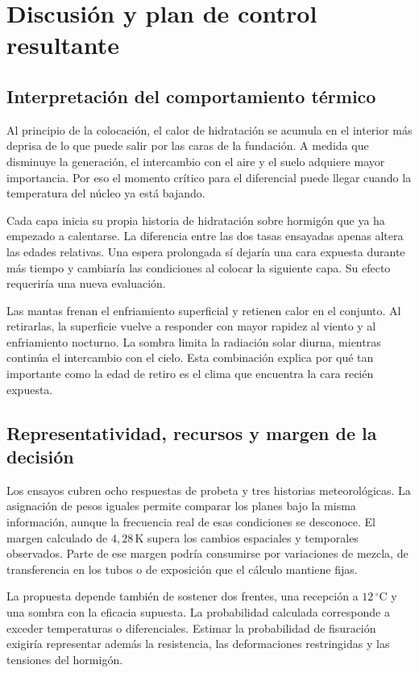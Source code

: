 \section{Discusión y plan de control resultante}
\label{sec:discusion-control}

\subsection{Interpretación del comportamiento térmico}
Al principio de la colocación, el calor de hidratación se acumula en el interior más deprisa de lo que puede salir por las caras de la fundación. A medida que disminuye la generación, el intercambio con el aire y el suelo adquiere mayor importancia. Por eso el momento crítico para el diferencial puede llegar cuando la temperatura del núcleo ya está bajando.

Cada capa inicia su propia historia de hidratación sobre hormigón que ya ha empezado a calentarse. La diferencia entre las dos tasas ensayadas apenas altera las edades relativas. Una espera prolongada sí dejaría una cara expuesta durante más tiempo y cambiaría las condiciones al colocar la siguiente capa. Su efecto requeriría una nueva evaluación.

Las mantas frenan el enfriamiento superficial y retienen calor en el conjunto. Al retirarlas, la superficie vuelve a responder con mayor rapidez al viento y al enfriamiento nocturno. La sombra limita la radiación solar diurna, mientras continúa el intercambio con el cielo. Esta combinación explica por qué tan importante como la edad de retiro es el clima que encuentra la cara recién expuesta.

\subsection{Representatividad, recursos y margen de la decisión}
Los ensayos cubren ocho respuestas de probeta y tres historias meteorológicas. La asignación de pesos iguales permite comparar los planes bajo la misma información, aunque la frecuencia real de esas condiciones se desconoce. El margen calculado de $4{,}28\,\mathrm K$ supera los cambios espaciales y temporales observados. Parte de ese margen podría consumirse por variaciones de mezcla, de transferencia en los tubos o de exposición que el cálculo mantiene fijas.

La propuesta depende también de sostener dos frentes, una recepción a $12\,^\circ\mathrm C$ y una sombra con la eficacia supuesta. La probabilidad calculada corresponde a exceder temperaturas o diferenciales. Estimar la probabilidad de fisuración exigiría representar además la resistencia, las deformaciones restringidas y las tensiones del hormigón.

